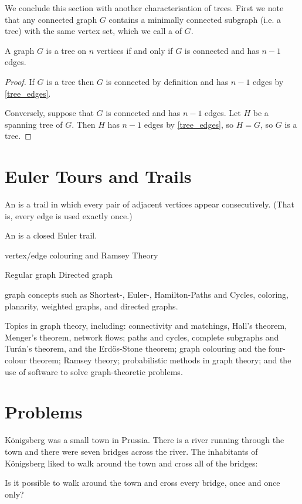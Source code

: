 We conclude this section with another characterisation of trees. First we note that any connected graph $G$ contains a minimally connected subgraph (i.e. a tree) with the same vertex set, which we call a  of $G$.

\begin{lemma}
A graph $G$ is a tree on $n$ vertices if and only if $G$ is connected and has $n-1$ edges.
\end{lemma}
\begin{proof}
If $G$ is a tree then $G$ is connected by definition and has $n-1$ edges by \cref{tree_edges}. 

Conversely, suppose that $G$ is connected and has $n-1$ edges. Let $H$ be a spanning tree of $G$. Then $H$ has $n-1$ edges by \cref{tree_edges}, so $H = G$, so $G$ is a tree.
\end{proof}

\section{Euler Tours and Trails}
An  is a trail in which every pair of adjacent vertices appear consecutively. (That is, every edge is used exactly once.)

An  is a closed Euler trail.


vertex/edge colouring and Ramsey Theory

Regular graph
Directed graph

graph concepts such as Shortest-, Euler-, Hamilton-Paths and Cycles, coloring, planarity, weighted graphs, and directed graphs.

Topics in graph theory, including: connectivity and matchings, Hall's theorem, Menger's theorem, network flows; paths and cycles, complete subgraphs and Turán's theorem, and the Erdös-Stone theorem; graph colouring and the four-colour theorem; Ramsey theory; probabilistic methods in graph theory; and the use of software to solve graph-theoretic problems.
\pagebreak

\section*{Problems}
\begin{prbm}
K\"{o}nigsberg was a small town in Prussia. There is a river running through the town and there were seven bridges across the river. The inhabitants of K\"{o}nigsberg liked to walk around the town and cross all of the bridges:

Is it possible to walk around the town and cross every bridge, once and once only?
\end{prbm}

